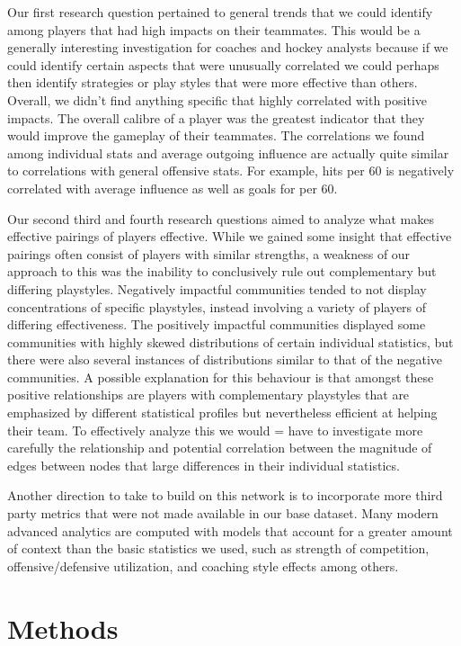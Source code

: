 \documentclass{article}
\begin{document}
Our first research question pertained to general trends that we could identify among players that had high impacts on their teammates.
This would be a generally interesting investigation for coaches and hockey analysts because if we could identify certain aspects that were unusually correlated we could perhaps then identify strategies or play styles that were more effective than others.
Overall, we didn't find anything specific that highly correlated with positive impacts.
The overall calibre of a player was the greatest indicator that they would improve the gameplay of their teammates.
The correlations we found among individual stats and average outgoing influence are actually quite similar to correlations with general offensive stats.
For example, hits per 60 is negatively correlated with average influence as well as goals for per 60.

Our second third and fourth research questions aimed to analyze what makes effective pairings of players effective.
While we gained some insight that effective pairings often consist of players with similar strengths, a weakness of our approach to this was the inability to conclusively rule out complementary but differing playstyles.
Negatively impactful communities tended to not display concentrations of specific playstyles, instead involving a variety of players of differing effectiveness.
The positively impactful communities displayed some communities with highly skewed distributions of certain individual statistics, but there were also several instances of distributions similar to that of the negative communities.
A possible explanation for this behaviour is that amongst these positive relationships are players with complementary playstyles that are emphasized by different statistical profiles but nevertheless efficient at helping their team.
To effectively analyze this we would = have to investigate more carefully the relationship and potential correlation between the magnitude of edges between nodes that large differences in their individual statistics.

Another direction to take to build on this network is to incorporate more third party metrics that were not made available in our base dataset.
Many modern advanced analytics are computed with models that account for a greater amount of context than the basic statistics we used, such as strength of competition, offensive/defensive utilization, and coaching style effects among others.



\section{Methods}
\end{document}
